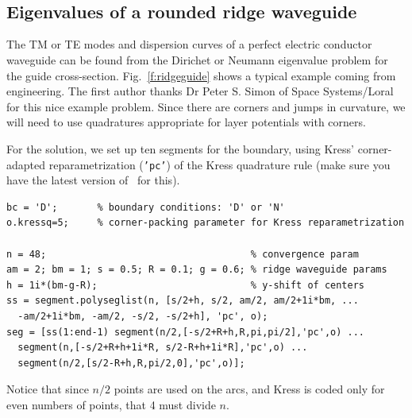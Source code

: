 \bfi %
\mbox{
\quad
{}
}
\efi

\bfi %
\mbox{
\quad
{}
}
\efi


\subsection{Eigenvalues of a rounded ridge waveguide}
\label{s:ridge}

The TM or TE modes and dispersion curves
of a perfect electric conductor waveguide can
be found from the Dirichet or Neumann eigenvalue problem for the
guide cross-section.
Fig.~\ref{f:ridgeguide} shows a typical example coming from engineering.
The first author thanks Dr Peter S. Simon of
Space Systems/Loral for this nice example problem.
Since there are corners and jumps in curvature, we will need to use
quadratures appropriate for layer potentials with corners.

For the solution, we set up ten segments for the boundary,
using Kress' corner-adapted reparametrization ({\tt 'pc'}) of the Kress
quadrature rule (make sure you have the latest version of \mpspack\
for this).
\begin{verbatim}
bc = 'D';       % boundary conditions: 'D' or 'N'
o.kressq=5;     % corner-packing parameter for Kress reparametrization

n = 48;                                    % convergence param
am = 2; bm = 1; s = 0.5; R = 0.1; g = 0.6; % ridge waveguide params
h = 1i*(bm-g-R);                           % y-shift of centers
ss = segment.polyseglist(n, [s/2+h, s/2, am/2, am/2+1i*bm, ...
  -am/2+1i*bm, -am/2, -s/2, -s/2+h], 'pc', o);
seg = [ss(1:end-1) segment(n/2,[-s/2+R+h,R,pi,pi/2],'pc',o) ...
  segment(n,[-s/2+R+h+1i*R, s/2-R+h+1i*R],'pc',o) ...
  segment(n/2,[s/2-R+h,R,pi/2,0],'pc',o)];
\end{verbatim}
Notice that since $n/2$ points are used on the arcs, and Kress is coded
only for even numbers of points, that 4 must divide $n$.

